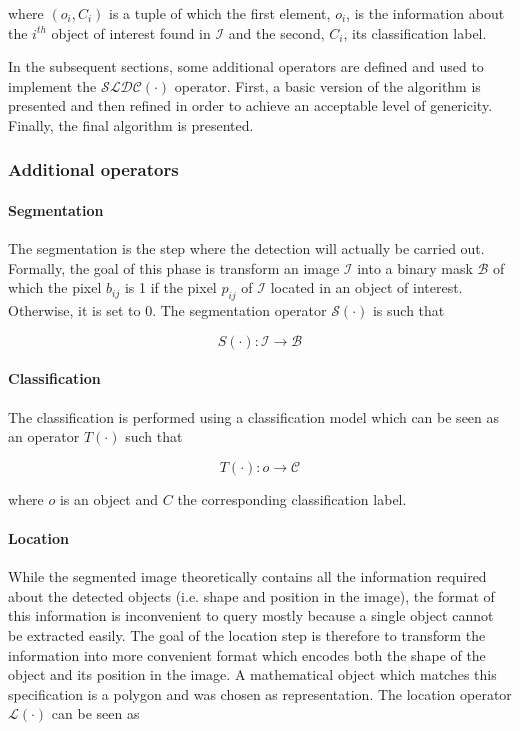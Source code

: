 where $(o_i, C_i)$ is a tuple of which the first element, $o_i$, is the information about the $i^{th}$ object of interest found in $\mathcal{I}$ and the second, $C_i$, its classification label. 

In the subsequent sections, some additional operators are defined and used to implement the $\mathcal{SLDC}(\cdot)$ operator. First, a basic version of the algorithm is presented and then refined in order to achieve an acceptable level of genericity. Finally, the final algorithm is presented. 

\subsubsection{Additional operators}

\paragraph{Segmentation} The segmentation is the step where the detection will actually be carried out. Formally, the goal of this phase is transform an image $\mathcal{I}$ into a binary mask $\mathcal{B}$ of which the pixel $b_{ij}$ is 1 if the pixel $p_{ij}$ of $\mathcal{I}$ located in an object of interest. Otherwise, it is set to 0. The segmentation operator $\mathcal{S}(\cdot)$ is such that

\begin{equation}
	\label{eqn:operator_segment}
	S(\cdot) : \mathcal{I} \rightarrow \mathcal{B}
\end{equation}

\paragraph{Classification} The classification is performed using a classification model which can be seen as an operator $T(\cdot)$ such that 

\begin{equation}
	T(\cdot) : o \rightarrow \mathcal{C}	
\end{equation}

where $o$ is an object and $C$ the corresponding classification label. 

\paragraph{Location} While the segmented image theoretically contains all the information required about the detected objects (i.e. shape and position in the image), the format of this information is inconvenient to query mostly because a single object cannot be extracted easily. The goal of the location step is therefore to transform the information into more convenient format which encodes both the shape of the object and its position in the image. A mathematical object which matches this specification is a polygon and was chosen as representation. The location operator $\mathcal{L}(\cdot)$ can be seen as 

